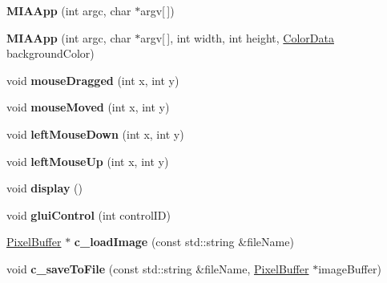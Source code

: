 \begin{DoxyCompactItemize}
\item 
\hypertarget{classMIAApp_a99c82819221bee486f5eb1628df3dc58}{{\bfseries M\-I\-A\-App} (int argc, char $\ast$argv\mbox{[}$\,$\mbox{]})}\label{classMIAApp_a99c82819221bee486f5eb1628df3dc58}

\item 
\hypertarget{classMIAApp_a0dbcbcd31a2ba7fd55988354e9cc0d93}{{\bfseries M\-I\-A\-App} (int argc, char $\ast$argv\mbox{[}$\,$\mbox{]}, int width, int height, \hyperlink{classColorData}{Color\-Data} background\-Color)}\label{classMIAApp_a0dbcbcd31a2ba7fd55988354e9cc0d93}

\item 
\hypertarget{classMIAApp_a92f074cdaf7660abf7da902ad78f7ceb}{void {\bfseries mouse\-Dragged} (int x, int y)}\label{classMIAApp_a92f074cdaf7660abf7da902ad78f7ceb}

\item 
\hypertarget{classMIAApp_a89342bccfdad6cd476677f19edf7c9bd}{void {\bfseries mouse\-Moved} (int x, int y)}\label{classMIAApp_a89342bccfdad6cd476677f19edf7c9bd}

\item 
\hypertarget{classMIAApp_a8174b71f6537aea41c1cda099e47a0d0}{void {\bfseries left\-Mouse\-Down} (int x, int y)}\label{classMIAApp_a8174b71f6537aea41c1cda099e47a0d0}

\item 
\hypertarget{classMIAApp_a804a0a6a7e3f165adea88bb416232803}{void {\bfseries left\-Mouse\-Up} (int x, int y)}\label{classMIAApp_a804a0a6a7e3f165adea88bb416232803}

\item 
\hypertarget{classMIAApp_a5b88636a4d17872ab922a4b088696608}{void {\bfseries display} ()}\label{classMIAApp_a5b88636a4d17872ab922a4b088696608}

\item 
\hypertarget{classMIAApp_affee3adfef9a7491607d93554a2bb9c0}{void {\bfseries glui\-Control} (int control\-I\-D)}\label{classMIAApp_affee3adfef9a7491607d93554a2bb9c0}

\item 
\hypertarget{classMIAApp_af8754c105488cb94fa3685f128834e74}{\hyperlink{classPixelBuffer}{Pixel\-Buffer} $\ast$ {\bfseries c\-\_\-load\-Image} (const std\-::string \&file\-Name)}\label{classMIAApp_af8754c105488cb94fa3685f128834e74}

\item 
\hypertarget{classMIAApp_a235d97a98d806280da6e7c7f8d33f016}{void {\bfseries c\-\_\-save\-To\-File} (const std\-::string \&file\-Name, \hyperlink{classPixelBuffer}{Pixel\-Buffer} $\ast$image\-Buffer)}\label{classMIAApp_a235d97a98d806280da6e7c7f8d33f016}


\end{DoxyCompactItemize}
